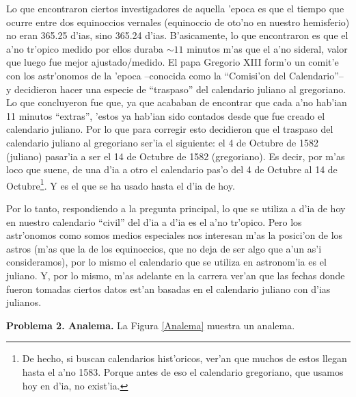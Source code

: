 \documentclass{article}
\begin{document}
Lo que encontraron ciertos investigadores de aquella 'epoca es que el tiempo que ocurre entre dos equinoccios vernales (equinoccio de oto'no en nuestro hemisferio) no eran 365.25 d'ias, sino 365.24 d'ias. B'asicamente, lo que encontraron es que el a'no tr'opico medido por ellos duraba $\sim 11$ minutos m'as que el a'no sideral, valor que luego fue mejor ajustado/medido.
El papa Gregorio XIII form'o un comit'e con los astr'onomos de la 'epoca --conocida como la ``Comisi'on del Calendario''-- y decidieron hacer una especie de ``traspaso'' del calendario juliano al gregoriano. Lo que concluyeron fue que, ya que acababan de encontrar que cada a'no hab'ian 11 minutos ``extras'', 'estos ya hab'ian sido contados desde que fue creado el calendario juliano. Por lo que para corregir esto decidieron que el traspaso del calendario juliano al gregoriano ser'ia el siguiente: el 4 de Octubre de 1582 (juliano) pasar'ia a ser el 14 de Octubre de 1582 (gregoriano). Es decir, por m'as loco que suene, de una d'ia a otro el calendario pas'o del 4 de Octubre al 14 de Octubre\footnote{De hecho, si buscan calendarios hist'oricos, ver'an que muchos de estos llegan hasta el a'no 1583. Porque antes de eso el calendario gregoriano, que usamos hoy en d'ia, no exist'ia.}. Y es el que se ha usado hasta el d'ia de hoy.

Por lo tanto, respondiendo a la pregunta principal, lo que se utiliza a d'ia de hoy en nuestro calendario ``civil'' del d'ia a d'ia es el a'no tr'opico. Pero los astr'onomos como somos medios especiales nos interesan m'as la posici'on de los astros (m'as que la de los equinoccios, que no deja de ser algo que a'un as'i consideramos), por lo mismo el calendario que se utiliza en astronom'ia es el juliano. Y, por lo mismo, m'as adelante en la carrera ver'an que las fechas donde fueron tomadas ciertos datos est'an basadas en el calendario juliano con d'ias julianos.
\vspace{5mm}

\textbf{Problema 2. Analema.} La Figura \ref{Analema} muestra un analema. 
\end{document}
